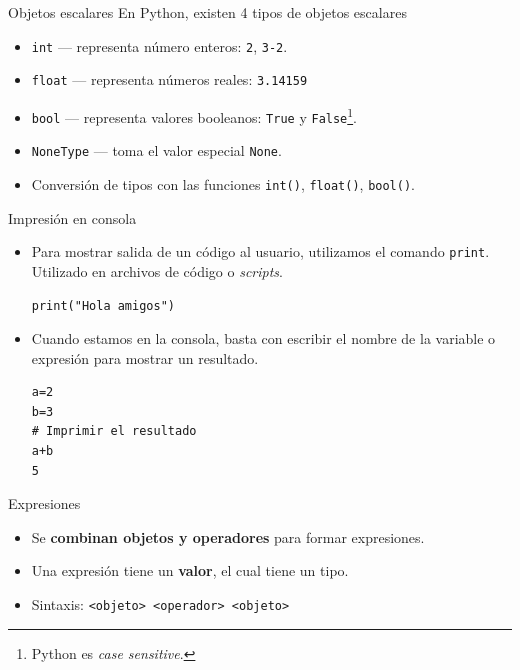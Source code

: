 \documentclass[mathserif]{beamer}
\begin{document}
\begin{frame}{Objetos escalares}
    En Python, existen 4 tipos de objetos escalares
    \begin{itemize}
        \item \lstinline|int| --- representa número enteros: \lstinline|2|, \lstinline|3-2|. 
        \item \lstinline|float| --- representa números reales: \lstinline|3.14159|
        \item \lstinline|bool| --- representa valores booleanos: \lstinline|True| y \lstinline|False|\footnote{Python es \textit{case sensitive}.}.
        \item \lstinline|NoneType| --- toma el valor especial \lstinline|None|.
    \end{itemize}
    
    \begin{itemize}
        \item Conversión de tipos con las funciones \lstinline|int()|, \lstinline|float()|, \lstinline|bool()|.
    \end{itemize}
    
\end{frame}

\begin{frame}[fragile]{Impresión en consola}
    \begin{itemize}
        \item Para mostrar salida de un código al usuario, utilizamos el comando \lstinline|print|. {\blue Utilizado en archivos de código o \textit{scripts}}.
        
        \begin{blurb}
        \centering 
        \lstinline|print("Hola amigos")|
        \end{blurb}
        
        \item Cuando {\blue estamos en la consola}, basta con escribir el nombre de la variable o expresión para mostrar un resultado. 
        
\begin{lstlisting}
a=2
b=3
# Imprimir el resultado
a+b
5
\end{lstlisting}
        
    \end{itemize}
\end{frame}

\begin{frame}{Expresiones}
    \begin{itemize}
        \item Se {\bfseries\orange combinan objetos y operadores} para formar expresiones.
        
        \item Una expresión tiene un {\bfseries\orange valor}, el cual tiene un tipo. 
        
        \item Sintaxis: \lstinline|<objeto> <operador> <objeto>|
    \end{itemize}
\end{frame}
\end{document}

